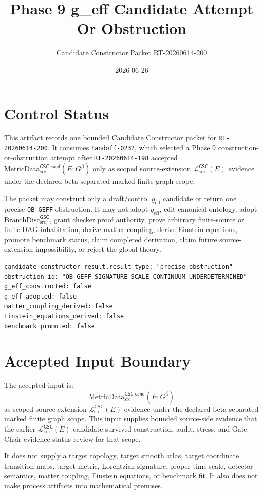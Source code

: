\documentclass[11pt]{article}
\title{Phase 9 g\_eff Candidate Attempt Or Obstruction}
\author{Candidate Constructor Packet RT-20260614-200}
\date{2026-06-26}
\newcommand{\BranchDisc}{\mathrm{BranchDisc}_{\mathrm{src}}^{\mathsf{GSC}}}
\newcommand{\MetricDataCand}{\mathrm{MetricData}_{\mathrm{src}}^{\mathsf{GSC\mbox{-}cand}}}
\newcommand{\MetricData}{\mathcal{L}_{\mathrm{src}}^{\mathsf{GSC}}}
\newcommand{\Gbeta}{G^{\beta}}
\newcommand{\geff}{g_{\mathrm{eff}}}
\begin{document}
\maketitle

\section{Control Status}

This artifact records one bounded Candidate Constructor packet for
\texttt{RT-20260614-200}. It consumes \texttt{handoff-0232}, which selected a
Phase 9 construction-or-obstruction attempt after \texttt{RT-20260614-198}
accepted \(\MetricDataCand(E;\Gbeta)\) only as scoped source-extension
\(\MetricData(E)\) evidence under the declared beta-separated marked finite
graph scope.

The packet may construct only a draft/control \(\geff\) candidate or return
one precise \texttt{OB-GEFF} obstruction. It may not adopt \(\geff\), edit
canonical ontology, adopt \(\BranchDisc\), grant checker proof authority,
prove arbitrary finite-source or finite-DAG inhabitation, derive matter
coupling, derive Einstein equations, promote benchmark status, claim completed
derivation, claim future source-extension impossibility, or reject the global
theory.

\begin{verbatim}
candidate_constructor_result.result_type: "precise_obstruction"
obstruction_id: "OB-GEFF-SIGNATURE-SCALE-CONTINUUM-UNDERDETERMINED"
g_eff_constructed: false
g_eff_adopted: false
matter_coupling_derived: false
Einstein_equations_derived: false
benchmark_promoted: false
\end{verbatim}

\section{Accepted Input Boundary}

The accepted input is:
\[
  \MetricDataCand(E;\Gbeta)
\]
as scoped source-extension \(\MetricData(E)\) evidence under the declared
beta-separated marked finite graph scope. This input supplies bounded
source-side evidence that the earlier \(\MetricData(E)\) candidate survived
construction, audit, stress, and Gate Chair evidence-status review for that
scope.

It does not supply a target topology, target smooth atlas, target coordinate
transition maps, target metric, Lorentzian signature, proper-time scale,
detector semantics, matter coupling, Einstein equations, or benchmark fit.
It also does not make process artifacts into mathematical premises.
\end{document}
